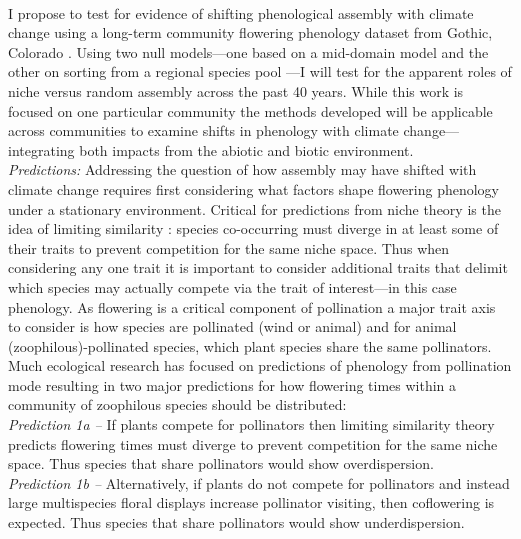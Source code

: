 \documentclass[12pt,a4paper,oneside]{article}
\begin{document}
\vspace{1.5ex}\\
I propose to test for evidence of shifting phenological assembly with climate change using a long-term community flowering phenology dataset from Gothic, Colorado \citep{Inouye:2008gj,CaraDonna2014}. Using two null models---one based on a mid-domain model \citep{Morales:2005ex} and the other on sorting from a regional species pool \citep{poole1979}---I will test for the apparent roles of niche versus random assembly across the past 40 years. While this work is focused on one particular community the methods developed will be applicable across communities to examine shifts in phenology with climate change---integrating both impacts from the abiotic and biotic environment.
\vspace{1.5ex}\\
\emph{Predictions:}
Addressing the question of how assembly may have shifted with climate change requires first considering what factors shape flowering phenology under a stationary environment. Critical for predictions from niche theory is the idea of limiting similarity \citep{HUTCHINSON:1959mz,ABRAMS:1980dq}: species co-occurring must diverge in at least some of their traits to prevent competition for the same niche space. Thus when considering any one trait it is important to consider additional traits that delimit which species may actually compete via the trait of interest---in this case phenology. As flowering is a critical component of pollination \citep{Brody:1997ro,botes2008} a major trait axis to consider is how species are pollinated (wind or animal) and for animal (zoophilous)-pollinated species, which plant species share the same pollinators. Much ecological research has focused on predictions of phenology from pollination mode resulting in two major predictions for how flowering times within a community of zoophilous species should be distributed:\\
\emph{Prediction 1a --} If plants compete for pollinators then limiting similarity theory predicts flowering times must diverge to prevent competition for the same niche space. Thus species that share pollinators would show overdispersion.\\
\emph{Prediction 1b --} Alternatively, if plants do not compete for pollinators and instead large multispecies floral displays increase pollinator visiting, then coflowering is expected. Thus species that share pollinators would show underdispersion.
\vspace{1.5ex}\\
\end{document}
